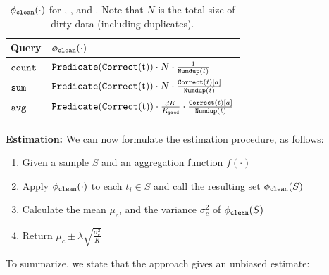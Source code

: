 \begin{table}[htup]\vspace{-1em}

\small
\caption{$\phi_{\texttt{clean} } (\cdot)$ for \countfunc, \sumfunc, and \avgfunc. Note that $N$ is the total size of dirty data (including duplicates).}
\centering 
\begin{tabular}{l l}
\hline\hline
Query & $\phi_{\texttt{clean} } (\cdot)$\\
\hline  %
\vspace{.5em}
$\texttt{count} $ & $
		\Predicatec{t}\cdot N\cdot\frac{1}{\Dedup{t}{P}}
$ \\\vspace{.5em} %
$\texttt{sum} $ & $
		\Predicatec{t}\cdot N\cdot\frac{\Correct{t}[a]}{\Dedup{t}{P}}
$ \\\vspace{.5em}
$\texttt{avg} $ & $
		\Predicatec{t}\cdot \frac{dK}{K_{\pred}}\cdot\frac{\Correct{t}[a]}{\Dedup{t}{P}}
$ \\ [1ex] %
\hline %
\label{tbl:transform-new}
\end{tabular}\vspace{-2em}
\end{table}


\vspace{.5em}
{\noindent \bf \sampleclean Estimation:}
We can now formulate the \sampleclean estimation procedure, as follows:

\begin{enumerate}
\item Given a sample $S$ and an aggregation function $f(\cdot)$\vspace{-.5em}
\item Apply $\phi_{\texttt{clean} } (\cdot)$ to each $t_i \in S$ and call the resulting set $\phi_{\texttt{clean} } (S)$\vspace{-.5em}
\item Calculate the mean $\mu_c$, and the variance $\sigma_c^2$ of $\phi_{\texttt{clean} } (S)$\vspace{-.5em}
\item Return $\mu_c \pm \lambda \sqrt{\frac{\sigma_c^2}{K}}$\vspace{-.5em}
\end{enumerate}

To summarize, we state that the \sampleclean approach gives an unbiased estimate:

